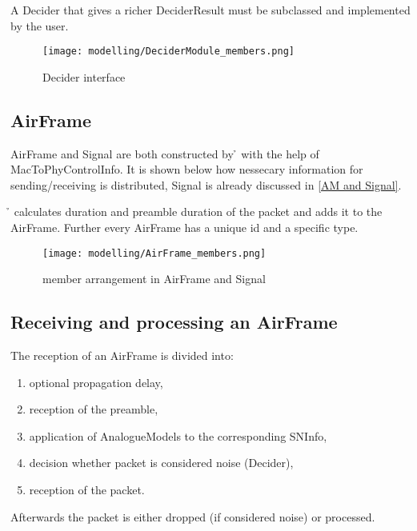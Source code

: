 A Decider that gives a richer DeciderResult must be subclassed and implemented by the user.

\begin{figure}[H]
 \centering
 \texttt{[image: modelling/DeciderModule\_members.png]}
 \caption{Decider interface}
 \label{fig: Decider interface}
\end{figure}


\subsection{AirFrame}
\label{AirFrame and Signal}

AirFrame and Signal are both constructed by \h{\bp} with the help of MacToPhyControlInfo.
It is shown below how nessecary information for sending/receiving is distributed, Signal is already discussed in \ref{AM and Signal}.

\h{\bp} calculates duration and preamble duration of the packet and adds it to the AirFrame. Further every AirFrame has a unique id and a specific type.


\begin{figure}[H]
 \centering
 \texttt{[image: modelling/AirFrame\_members.png]}
 \caption{member arrangement in AirFrame and Signal}
 \label{fig: member AirFrame}
\end{figure}





\subsection{Receiving and processing an AirFrame}

The reception of an AirFrame is divided into:
\begin{enumerate}
	
	\item optional propagation delay,
	\item reception of the preamble,
	\item application of AnalogueModels to the corresponding SNInfo,
	\item decision whether packet is considered noise (Decider),
	\item reception of the packet.
\end{enumerate}

Afterwards the packet is either dropped (if considered noise) or processed. 

